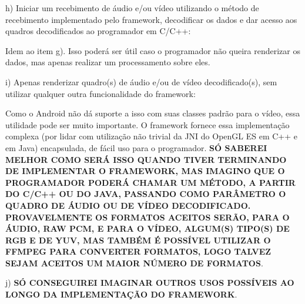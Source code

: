 \documentclass{acm_proc_article-sp}
\newcommand{\todo}[1]{\textcolor[rgb]{1.00,0.00,0.00}{\bf \uppercase{#1}}}
\begin{document}
h) Iniciar um recebimento de áudio e/ou vídeo utilizando o método de recebimento implementado pelo framework, decodificar os dados e dar acesso aos quadros decodificados ao programador em C/C++:

Idem ao item g). Isso poderá ser útil caso o programador não queira renderizar os dados, mas apenas realizar um processamento sobre eles.

i) Apenas renderizar quadro(s) de áudio e/ou de vídeo decodificado(s), sem utilizar qualquer outra funcionalidade do framework:

Como o Android não dá suporte a isso com suas classes padrão para o vídeo, essa utilidade pode ser muito importante. O framework fornece essa implementação complexa (por lidar com utilização não trivial da JNI do OpenGL ES em C++ e em Java) encapsulada, de fácil uso para o programador. \todo{só saberei melhor como será isso quando tiver terminando de implementar o framework, mas imagino que o programador poderá chamar um método, a partir do C/C++ ou do Java, passando como parâmetro o quadro de áudio ou de vídeo decodificado. Provavelmente os formatos aceitos serão, para o áudio, RAW PCM, e para o vídeo, algum(s) tipo(s) de RGB e de YUV, mas também é possível utilizar o ffmpeg para converter formatos, logo talvez sejam aceitos um maior número de formatos}.

j) \todo{só conseguirei imaginar outros usos possíveis ao longo da implementação do framework}.

%

%
%
\balancecolumns
\end{document}
